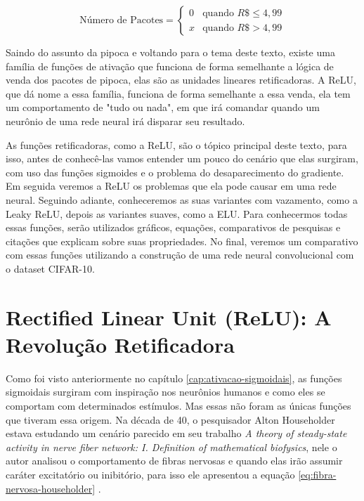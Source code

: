 \begin{equation}
    \text{Número de Pacotes} = \begin{cases} 0 & \text{quando } R\$ \leq  4,99 \\ x & \text{quando } R\$ > 4,99 \end{cases}
    \label{eq: VendaPipoca}
\end{equation}

Saindo do assunto da pipoca e voltando para o tema deste texto, existe uma família de funções de ativação que funciona de forma semelhante a lógica de venda dos pacotes de pipoca, elas são as unidades lineares retificadoras. A ReLU, que dá nome a essa família, funciona de forma semelhante a essa venda, ela tem um comportamento de "tudo ou nada", em que irá comandar quando um neurônio de uma rede neural irá disparar seu resultado.

As funções retificadoras, como a ReLU, são o tópico principal deste texto, para isso, antes de conhecê-las vamos entender um pouco do cenário que elas surgiram, com uso das funções sigmoides e o problema do desaparecimento do gradiente. Em seguida veremos a ReLU os problemas que ela pode causar em uma rede neural. Seguindo adiante, conheceremos as suas variantes com vazamento, como a Leaky ReLU, depois as variantes suaves, como a ELU. Para conhecermos todas essas funções, serão utilizados gráficos, equações, comparativos de pesquisas e citações que explicam sobre suas propriedades. No final, veremos um comparativo com essas funções utilizando a construção de uma rede neural convolucional com o dataset CIFAR-10.


\section{Rectified Linear Unit (ReLU): A Revolução Retificadora}

Como foi visto anteriormente no capítulo \ref{cap:ativacao-sigmoidais}, as funções sigmoidais surgiram com inspiração nos neurônios humanos e como eles se comportam com determinados estímulos. Mas essas não foram as únicas funções que tiveram essa origem. Na década de 40, o pesquisador Alton Householder estava estudando um cenário parecido em seu trabalho \textit{A theory of steady-state activity in nerve fiber network: I. Definition of mathematical biofysics}, nele o autor analisou o comportamento de fibras nervosas e quando elas irão assumir caráter excitatório ou inibitório, para isso ele apresentou a equação \ref{eq:fibra-nervosa-householder} \parencite{Householder1941}.

